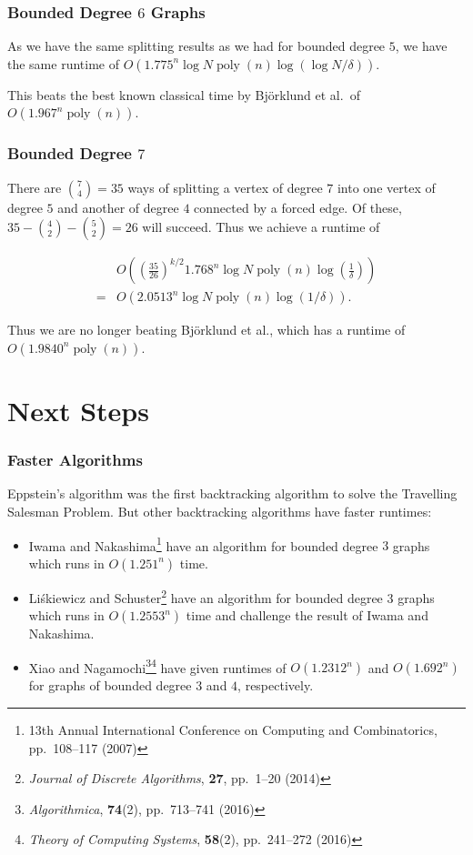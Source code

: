 \documentclass[]{beamer}
\DeclareMathOperator{\poly}{poly}
\begin{document}
\begin{frame}
\frametitle{Bounded Degree $6$ Graphs}
As we have the same splitting results as we had for bounded degree $5$, we have the same runtime of $O(1.775^n\log N\poly(n)\log(\log N/\delta))$.

This beats the best known classical time by Bj\"orklund et al.\ of $O(1.967^n\poly(n))$.
\end{frame}

\begin{frame}
\frametitle{Bounded Degree $7$}
There are $\binom{7}{4} = 35$ ways of splitting a vertex of degree $7$ into one vertex of degree $5$ and another of degree $4$ connected by a forced edge. Of these, $35 - \binom{4}{2} - \binom{5}{2} = 26$ will succeed. Thus we achieve a runtime of

\begin{align*}
&O\left(\left(\frac{35}{26}\right)^{k/2}1.768^n\log N\poly(n)\log\left(\frac{1}{\delta}\right)\right)\\
= &O(2.0513^n\log N\poly(n)\log(1/\delta)).
\end{align*}

Thus we are no longer beating Bj{\"o}rklund et al., which has a runtime of $O(1.9840^n\poly(n))$.
\end{frame}

\section{Next Steps}

\begin{frame}
\frametitle{Faster Algorithms}
Eppstein's algorithm was the first backtracking algorithm to solve the Travelling Salesman Problem. But other backtracking algorithms have faster runtimes:

\begin{itemize}
\item Iwama and Nakashima\footnote{13th Annual International Conference on Computing and Combinatorics, pp.\ 108--117 (2007)} have an algorithm for bounded degree $3$ graphs which runs in $O(1.251^n)$ time.
\item Li\'{s}kiewicz and Schuster\footnote{{\em Journal of Discrete Algorithms}, {\bf 27}, pp.\ 1--20 (2014)} have an algorithm for bounded degree $3$ graphs which runs in $O(1.2553^n)$ time and challenge the result of Iwama and Nakashima.
\item Xiao and Nagamochi\footnote{{\em Algorithmica}, {\bf 74}(2), pp.\ 713--741 (2016)}\footnote{{\em Theory of Computing Systems}, {\bf 58}(2), pp.\ 241--272 (2016)} have given runtimes of $O(1.2312^n)$ and $O(1.692^n)$ for graphs of bounded degree $3$ and $4$, respectively.
\end{itemize}
\end{frame}
\end{document}
